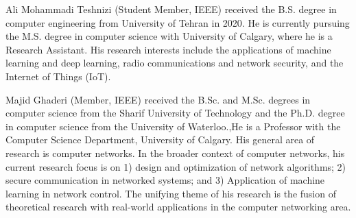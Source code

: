 % 
\begin{IEEEbiography}{Ali Mohammadi Teshnizi}
	(Student Member, IEEE) received the B.S. degree in computer engineering from
	University of Tehran in 2020. He is currently pursuing the M.S. degree in computer science with University of Calgary, where he is a Research
	Assistant. His research interests include the applications of machine learning and deep learning, radio communications and network security, and the Internet of Things (IoT).
\end{IEEEbiography}
\begin{IEEEbiography}
	{Majid Ghaderi}
(Member, IEEE) received the B.Sc. and M.Sc. degrees in computer science from the Sharif University of Technology and the Ph.D. degree in computer science from the University of Waterloo.,He is a Professor with the Computer Science Department, University of Calgary. His general area of research is computer networks. In the broader context of computer networks, his current research focus is on 1) design and optimization of network algorithms; 2) secure communication in networked systems; and 3) Application of machine learning in network control. The unifying theme of his research is the fusion of theoretical research with real-world applications in the computer networking area.
\end{IEEEbiography}

